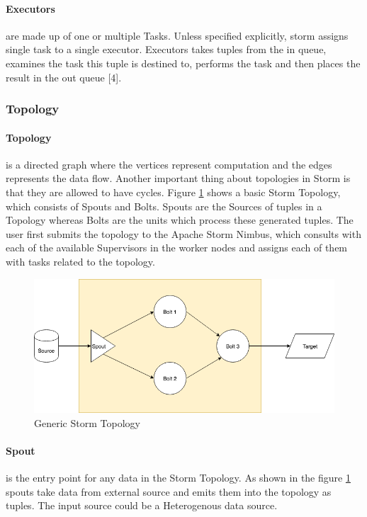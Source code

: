 \documentclass[runningheads,a4paper]{llncs}[2015/06/24]
\begin{document}
\paragraph{Executors} are made up of one or multiple Tasks. Unless specified explicitly, storm assigns single task to a single executor. Executors takes tuples from the in queue, examines the task this tuple is destined to, performs the task and then places the result in the out queue [4].

\subsubsection{Topology}
\paragraph{Topology} is a directed graph where the vertices represent computation and the edges represents the data flow. Another important thing about topologies in Storm is that they are allowed to have cycles. Figure \ref{fig:topo} shows a basic Storm Topology, which consists of Spouts and Bolts. Spouts are the Sources of tuples in a Topology whereas Bolts are the units which process these generated tuples. The user first submits the topology to the Apache Storm Nimbus, which consults with each of the available Supervisors in the worker nodes and assigns each of them with tasks related to the topology.

\begin{figure}
  \begin{center}
    \includegraphics[width=.7\textwidth]{topo.png}
    \caption{Generic Storm Topology}
    \label{fig:topo}
   \end{center}
\end{figure}

\paragraph{Spout} is the entry point for any data in the Storm Topology. As shown in the figure \ref{fig:topo} spouts take data from external source and emits them into the topology as tuples. The input source could be a Heterogenous data source.
\end{document}

